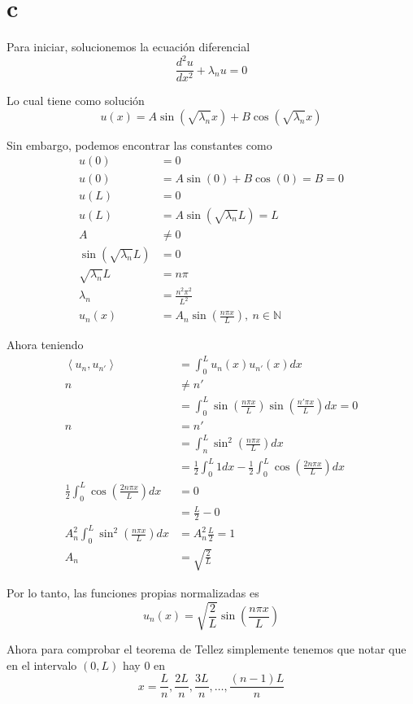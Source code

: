 \documentclass{report}
\begin{document}
\section{c}

Para iniciar, solucionemos la ecuación diferencial
\[\frac{d^2 u}{dx^2} + \lambda_n u  = 0\]

Lo cual tiene como solución 
\[u(x) = A \sin\left(\sqrt{\lambda_n} x\right) + B \cos\left(\sqrt{\lambda_n} x\right)\]

Sin embargo, podemos encontrar las constantes como
\begin{align*}
u(0) &= 0\\
u(0) &= A\sin(0) + B\cos(0) = B = 0\\
u(L) &= 0\\
u(L) &= A\sin(\sqrt{\lambda_n}L ) = L\\
A &\neq 0\\
\sin(\sqrt{\lambda_n} L) &= 0\\
\sqrt{\lambda_n} L &= n\pi\\
\lambda_n &= \frac{n^2\pi^2}{L^2}\\
u_n(x) &= A_n \sin\left(\frac{n\pi x}{L}\right),\ n \in \mathbb{N}
\end{align*}

Ahora teniendo
\begin{align*}
\left<u_n, u_{n'}\right> &= \int_0^L u_n (x) u_{n'}(x) dx\\
n &\neq n'\\
&= \int_0^L \sin\left(\frac{n \pi x}{L}\right)\sin\left(\frac{n' \pi x}{L}\right) dx = 0\\
n &= n'\\
&= \int_n^L  \sin^2\left(\frac{n \pi x}{L}\right) dx\\
&= \frac{1}{2} \int_0^L 1 dx - \frac{1}{2}\int_0^L \cos\left(\frac{2n\pi x}{L}\right) dx\\
\frac{1}{2}\int_0^L \cos\left(\frac{2n\pi x}{L}\right) dx &= 0\\
&= \frac{L}{2} - 0\\
A_n^2 \int_0^L \sin^2\left(\frac{n\pi x}{L}\right) dx &= A_n^2 \frac{L}{2} = 1\\
A_n &= \sqrt{\frac{2}{L}}
\end{align*}

Por lo tanto, las funciones propias normalizadas es
\[u_n(x) = \sqrt{\frac{2}{L}}\sin\left(\frac{n\pi x}{L}\right)\]

Ahora para comprobar el teorema de Tellez simplemente tenemos que notar que en el intervalo $(0, L)$ hay 0 en 
\[x = \frac{L}{n}, \frac{2L}{n},\frac{3L}{n},\ldots, \frac{(n - 1)L}{n}\]
\end{document}
